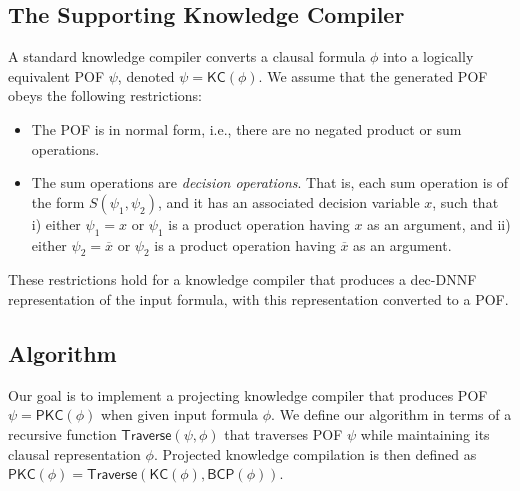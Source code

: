 \documentclass[letterpaper,USenglish,cleveref, autoref, thm-restate]{lipics-v2021}
\newcommand{\obar}[1]{\overline{#1}}
\newcommand{\algo}[1]{\textsf{#1}}
\newcommand{\kc}{\algo{KC}}
\newcommand{\pkc}{\algo{PKC}}
\newcommand{\traverse}{\algo{Traverse}}
\newcommand{\bcp}{\algo{BCP}}
\begin{document}
\subsection{The Supporting Knowledge Compiler}

A standard knowledge compiler converts a clausal formula $\phi$ into a logically equivalent POF $\psi$, denoted
$\psi = \kc(\phi)$.
We assume that the generated POF obeys the following restrictions:
\begin{itemize}
\item The POF is in normal form, i.e., there are no negated product or sum operations.
\item The sum operations are \emph{decision operations}.  That is, each sum operation is of the form $S(\psi_1, \psi_2)$, and it has an associated decision variable $x$,
  such that i) either $\psi_1 = x$ or $\psi_1$ is a product operation having $x$ as an argument, and ii)
either $\psi_2 = \obar{x}$ or $\psi_2$ is a product operation having $\obar{x}$ as an argument.
\end{itemize}
These restrictions hold for a knowledge compiler that produces a dec-DNNF representation of the input formula, with this representation converted to a POF\@.

\subsection{Algorithm}

Our goal is to implement a projecting knowledge compiler that produces POF $\psi = \pkc(\phi)$ when given input formula $\phi$.
We define our algorithm in terms of a recursive function $\traverse(\psi, \phi)$ that traverses POF $\psi$ while maintaining its clausal representation $\phi$.  Projected knowledge compilation is then defined
as $\pkc(\phi) = \traverse(\kc(\phi), \bcp(\phi))$.
\end{document}
